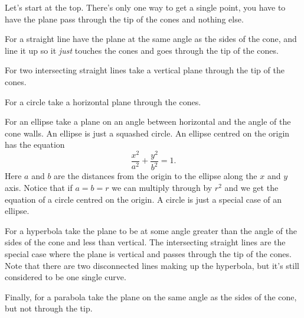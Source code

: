 \documentclass[fleqn]{LectureClass/LectureClass}
\begin{document}
    Let's start at the top.
    There's only one way to get a single point, you have to have the plane pass through the tip of the cones and nothing else.
    
    For a straight line have the plane at the same angle as the sides of the cone, and line it up so it \emph{just} touches the cones and goes through the tip of the cones.
    
    For two intersecting straight lines take a vertical plane through the tip of the cones.
    
    For a circle take a horizontal plane through the cones.
    
    For an ellipse take a plane on an angle between horizontal and the angle of the cone walls.
    An ellipse is just a squashed circle.
    An ellipse centred on the origin has the equation
    \begin{equation}
        \frac{x^2}{a^2} + \frac{y^2}{b^2} = 1.
    \end{equation}
    Here \(a\) and \(b\) are the distances from the origin to the ellipse along the \(x\) and \(y\) axis.
    Notice that if \(a = b = r\) we can multiply through by \(r^2\) and we get the equation of a circle centred on the origin.
    A circle is just a special case of an ellipse.
    
    For a hyperbola take the plane to be at some angle greater than the angle of the sides of the cone and less than vertical.
    The intersecting straight lines are the special case where the plane is vertical and passes through the tip of the cones.
    Note that there are two disconnected lines making up the hyperbola, but it's still considered to be one single curve.
    
    Finally, for a parabola take the plane on the same angle as the sides of the cone, but not through the tip.
    
\end{document}
